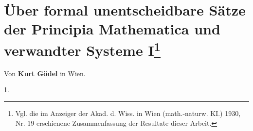 \documentclass[draft]{scrartcl}
\begin{document}



\section*{Über formal unentscheidbare Sätze der Principia Mathematica 
und verwandter Systeme I\protect\footnote{Vgl. die im Anzeiger der Akad. d. Wiss. in Wien
(math.-naturw. KI.) 1930, Nr. 19 erschienene Zusammenfassung der Resultate dieser Arbeit.}}

\begin{center}
Von \textbf{Kurt Gödel} in Wien.
\end{center}

\begin{center}
1.
\end{center}
\end{document}
